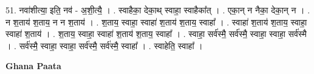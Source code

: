 \documentclass[17pt]{extarticle}
\begin{document}
51. नवा॑शीत्या॒ इति॒ नव॑ - अ॒शी॒त्यै॒ । . स्वाहैका॒ देका॒थ् स्वाहा॒ स्वाहैका᳚त् । . एका॒न् न नैका॒ देका॒न् न । . न श॒ताय॑ श॒ताय॒ न न श॒ताय॑ । . श॒ताय॒ स्वाहा॒ स्वाहा॑ श॒ताय॑ श॒ताय॒ स्वाहा᳚ । . स्वाहा॑ श॒ताय॑ श॒ताय॒ स्वाहा॒ स्वाहा॑ श॒ताय॑ । . श॒ताय॒ स्वाहा॒ स्वाहा॑ श॒ताय॑ श॒ताय॒ स्वाहा᳚ । . स्वाहा॒ सर्व॑स्मै॒ सर्व॑स्मै॒ स्वाहा॒ स्वाहा॒ सर्व॑स्मै । . सर्व॑स्मै॒ स्वाहा॒ स्वाहा॒ सर्व॑स्मै॒ सर्व॑स्मै॒ स्वाहा᳚ । . स्वाहेति॒ स्वाहा᳚ । \newline

\textbf{Ghana Paata } \newline
\end{document}
